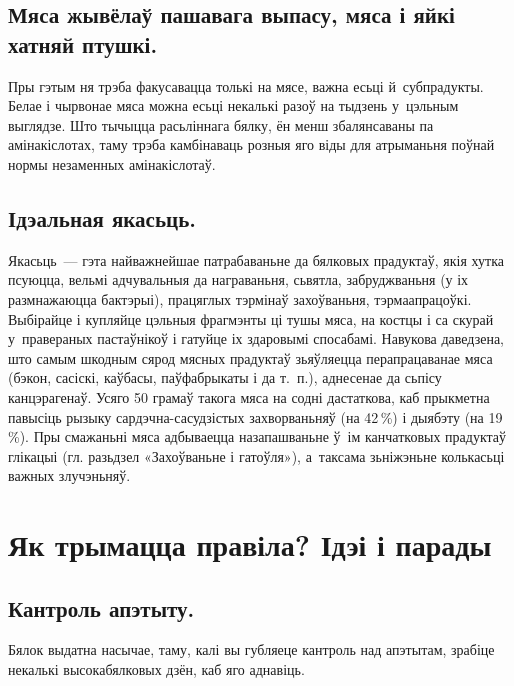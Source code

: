 
\subsection{Мяса жывёлаў пашавага выпасу, мяса і яйкі хатняй птушкі.}
Пры гэтым ня трэба факусавацца толькі на мясе, важна есьці й~субпрадукты. Белае і чырвонае мяса можна есьці некалькі разоў на тыдзень у~цэльным выглядзе. Што тычыцца расьліннага бялку, ён менш збалянсаваны па амінакіслотах, таму трэба камбінаваць розныя яго віды для атрыманьня поўнай нормы незаменных амінакіслотаў.

\subsection{Ідэальная якасьць.}
Якасьць~--- гэта найважнейшае патрабаваньне да бялковых прадуктаў, якія хутка псуюцца, вельмі адчувальныя да награваньня, сьвятла, забруджваньня (у іх размнажаюцца бактэрыі), працяглых тэрмінаў захоўваньня, тэрмаапрацоўкі. Выбірайце і купляйце цэльныя фрагмэнты ці тушы мяса, на костцы і са скурай у~правераных пастаўнікоў і гатуйце іх здаровымі спосабамі. Навукова даведзена, што самым шкодным сярод мясных прадуктаў зьяўляецца перапрацаванае мяса (бэкон, сасіскі, каўбасы, паўфабрыкаты і да т.~п.), аднесенае да сьпісу канцэрагенаў. Усяго 50 грамаў такога мяса на содні дастаткова, каб прыкметна павысіць рызыку сардэчна-сасудзістых захворваньняў (на 42\,\%) і дыябэту (на 19\,\%). Пры смажаньні мяса адбываецца назапашваньне ў~ім канчатковых прадуктаў глікацыі (гл. разьдзел «Захоўваньне і гатоўля»), а~таксама зьніжэньне колькасьці важных злучэньняў.

\section{Як трымацца правіла? Ідэі і парады}

\subsection{Кантроль апэтыту.}
Бялок выдатна насычае, таму, калі вы губляеце кантроль над апэтытам, зрабіце некалькі высокабялковых дзён, каб яго аднавіць.

